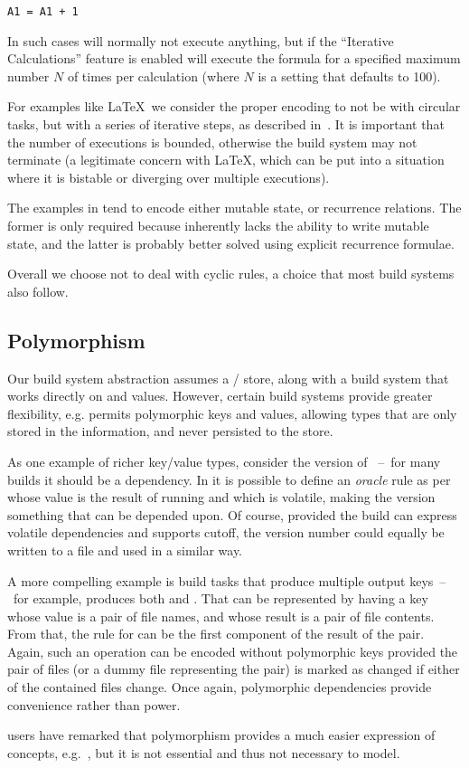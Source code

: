 \begin{verbatim}
A1 = A1 + 1
\end{verbatim}

\noindent
In such cases \Excel will normally not execute anything, but if the
``Iterative Calculations'' feature is enabled will execute the formula for a
specified maximum number $N$ of times per calculation (where $N$ is a
setting that defaults to 100).

For examples like \LaTeX~we consider the proper encoding to not be with circular
tasks, but with a series of iterative steps, as described
in~\cite{shake-fixed-point}. It is important that the number of executions is
bounded, otherwise the build system may not terminate (a legitimate concern
with \LaTeX, which can be put into a situation where it is bistable or diverging
over multiple executions).

The examples in \Excel tend to encode either mutable state, or recurrence
relations. The former is only required because \Excel inherently lacks the
ability to write mutable state, and the latter is probably better solved using
explicit recurrence formulae.

Overall we choose not to deal with cyclic rules, a choice that most build
systems also follow.

\subsection{Polymorphism}\label{sec-polymorphism}

Our build system abstraction assumes a / store, along with a build
system that works directly on  and  values. However, certain build
systems provide greater flexibility, e.g. \Shake permits polymorphic keys and
values, allowing types that are only stored in the \Shake information, and never
persisted to the store.

As one example of richer key/value types, consider the version of
~--~for many builds it should be a dependency. In \Shake it is possible
to define an \emph{oracle} rule as per~\cite{mitchell2012shake} whose value is
the result of running  and which is volatile, making the
 version something that can be depended upon. Of course, provided the
build can express volatile dependencies and supports cutoff, the version number
could equally be written to a file and used in a similar way.

A more compelling example is build tasks that produce multiple output
keys~--~for example,  produces both  and .
That can be represented by having a key whose value is a pair of file names, and
whose result is a pair of file contents. From that, the rule for 
can be the first component of the result of the pair. Again, such an operation
can be encoded without polymorphic keys provided the pair of files (or a dummy
file representing the pair) is marked as changed if either of the contained
files change. Once again, polymorphic dependencies provide convenience rather
than power.

\Shake users have remarked that polymorphism provides a much easier expression
of concepts, e.g.~\cite{hadrian}, but it is not essential and thus not necessary
to model.
